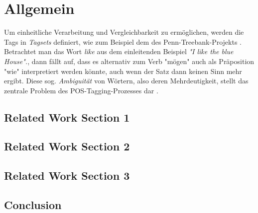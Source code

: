 %
\chapter{Allgemein}
\label{sec:general}

Um einheitliche Verarbeitung und Vergleichbarkeit zu ermöglichen, werden die Tags in \textit{Tagsets} definiert, wie zum Beispiel dem des Penn-Treebank-Projekts \linebreak \cite{Web:PennBank:2003}. \newline
Betrachtet man das Wort \textit{like} aus dem einleitenden Beispiel \textit{"I like the blue House".}, dann fällt auf, dass es alternativ zum Verb "mögen" auch als Präposition "wie" interpretiert werden könnte, auch wenn der Satz dann keinen Sinn mehr ergibt. Diese sog. \textit{Ambiguität} von Wörtern, also deren Mehrdeutigkeit, stellt das zentrale Problem des POS-Tagging-Prozesses dar \cite{Smith:2011}.

\section{Related Work Section 1}
\label{sec:related:sec1}

\Blindtext[2][2]

\section{Related Work Section 2}
\label{sec:related:sec2}

\Blindtext[3][2]

\section{Related Work Section 3}
\label{sec:related:sec3}

\Blindtext[4][2]

\section{Conclusion}
\label{sec:related:conclusion}

\Blindtext[2][1]
